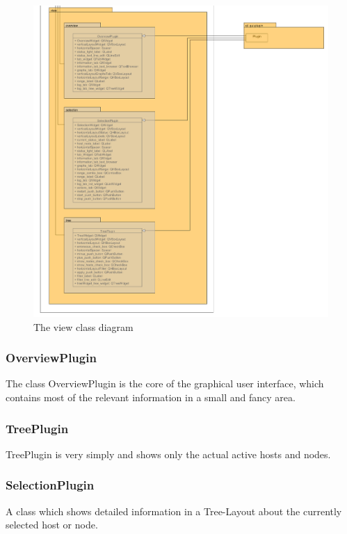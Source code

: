 \begin{figure}[!ht]
\begin{center}
\includegraphics[width=\linewidth]{./bilder/view.png}
\caption{The view class diagram}
\end{center}
\end{figure}
\subsubsection{OverviewPlugin}
The class OverviewPlugin is the core of the graphical user interface, which
contains most of the relevant information in a small and fancy area.
\subsubsection{TreePlugin}
TreePlugin is very simply and shows only the actual active hosts
and nodes.
\subsubsection{SelectionPlugin}
A class which shows detailed information in a Tree-Layout about the currently
selected host or node.
